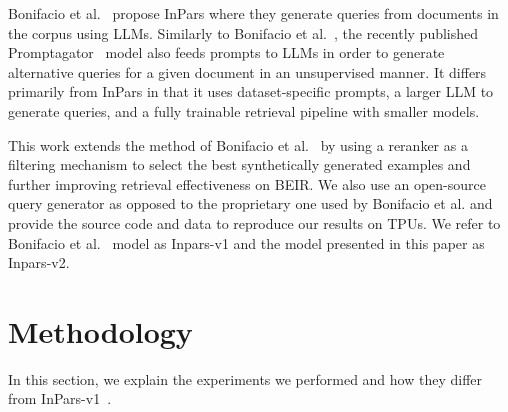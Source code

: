\documentclass{article}
\begin{document}
Bonifacio et al.~\cite{bonifacio2022inpars} propose InPars where they generate queries from documents in the corpus using LLMs. 
Similarly to Bonifacio et al.~\cite{bonifacio2022inpars}, the recently published Promptagator~\cite{dai2022promptagator} model also feeds prompts to LLMs in order to generate alternative queries for a given document in an unsupervised manner. It differs primarily from InPars in that it uses dataset-specific prompts, a larger LLM to generate queries, and a fully trainable retrieval pipeline with smaller models.

This work extends the method of Bonifacio et al.~\cite{bonifacio2022inpars} by using a reranker as a filtering mechanism to select the best synthetically generated examples and further improving retrieval effectiveness on BEIR. We also use an open-source query generator as opposed to the proprietary one used by Bonifacio et al. and provide the source code and data to reproduce our results on TPUs.
We refer to Bonifacio et al.~\cite{bonifacio2022inpars} model as Inpars-v1 and the model presented in this paper as Inpars-v2.





\section{Methodology}

In this section, we explain the experiments we performed and how they differ from InPars-v1~\cite{bonifacio2022inpars}.


\end{document}
